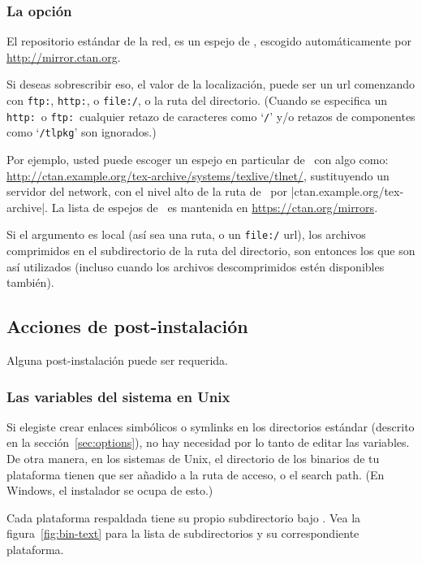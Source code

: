 \documentclass{article}
\begin{document}
\subsubsection{La opción }
\label{sec:location}

El repositorio estándar de la red, es un espejo de \CTAN{}, escogido
automáticamente por \url{http://mirror.ctan.org}.

Si deseas sobrescribir eso, el valor de la localización, puede ser un
url comenzando con \texttt{ftp:}, \texttt{http:}, o \texttt{file:/}, o
la ruta del directorio. (Cuando se especifica un \texttt{http:}\ o
\texttt{ftp:}\ cualquier retazo de caracteres como `\texttt{/}' y/o
retazos de componentes como `\texttt{/tlpkg}' son ignorados.)

Por ejemplo, usted puede escoger un espejo en particular de \CTAN\ con
algo como:
\url{http://ctan.example.org/tex-archive/systems/texlive/tlnet/},
sustituyendo un servidor del network, con el nivel alto de la ruta de
\CTAN\ por |ctan.example.org/tex-archive|. La lista de espejos de
\CTAN\ es mantenida en \url{https://ctan.org/mirrors}.

Si el argumento es local (así sea una ruta, o un \texttt{file:/} url),
los archivos comprimidos en el subdirectorio  de la ruta
del directorio, son entonces los que son así utilizados (incluso cuando los archivos
descomprimidos estén disponibles también). 

\subsection{Acciones de post-instalación}
\label{sec:postinstall}

Alguna post-instalación puede ser requerida.

\subsubsection{Las variables del sistema en Unix}
\label{sec:env}

Si elegiste crear enlaces simbólicos o symlinks en los directorios
estándar (descrito en la sección~\ref{sec:options}), no hay necesidad
por lo tanto de editar las variables. De otra manera, en los sistemas
de Unix, el directorio de los binarios de tu plataforma tienen que ser
añadido a la ruta de acceso, o el search path. (En Windows, el
instalador se ocupa de esto.)

Cada plataforma respaldada tiene su propio subdirectorio bajo
. Vea la figura~\ref{fig:bin-text} para la lista
de subdirectorios y su correspondiente plataforma. 
\end{document}
